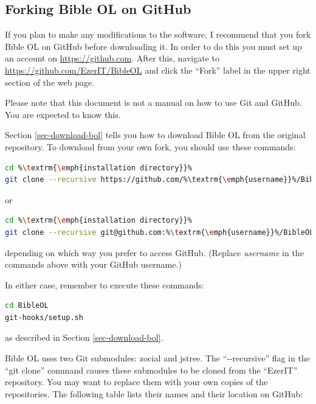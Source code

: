 \documentclass[11pt,oneside,a4paper]{memoir}
\begin{document}
\subsection{Forking Bible OL on GitHub}\label{sec-fork-github}

If you plan to make any modifications to the software, I recommend that you fork Bible OL on GitHub
before downloading it. In order to do this you must set up an account on \url{https://github.com}.
After this, navigate to \url{https://github.com/EzerIT/BibleOL} and click the ``Fork'' label in the
upper right section of the web page.

Please note that this document is not a manual on how to use Git and GitHub. You are expected to
know this.

Section \ref{sec-download-bol} tells you how to download Bible OL from the original repository. To
download from your own fork, you should use these commands:


\begin{lstlisting}[language=bash]
cd %\textrm{\emph{installation directory}}%
git clone --recursive https://github.com/%\textrm{\emph{username}}%/BibleOL
\end{lstlisting}

\noindent
or

\begin{lstlisting}[language=bash]
cd %\textrm{\emph{installation directory}}%
git clone --recursive git@github.com:%\textrm{\emph{username}}%/BibleOL.git
\end{lstlisting}

\noindent
depending on which way you prefer to access GitHub. (Replace \emph{username} in the commands above
with your GitHub username.)

In either case, remember to execute these commands:

\begin{lstlisting}[language=bash]
cd BibleOL
git-hooks/setup.sh
\end{lstlisting}

\noindent
as described in Section \ref{sec-download-bol}.

Bible OL uses two Git submodules: zocial and jstree.
The \mbox{``-\thinspace-recursive''} flag in the ``git clone'' command causes these submodules to be
cloned from the ``EzerIT'' repository. You may want to replace them with your own copies of the
repositories. The following table lists their names and their location on GitHub:
\end{document}
